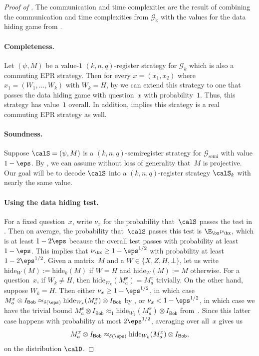 \documentclass[11pt]{article}
\newcommand{\hideq}{H}
\newcommand{\noop}{\bot}
\newcommand{\game}{\mathscr{G}}
\newcommand{\reg}[1]{{\mathsf{#1}}}
\newcommand{\hide}[2]{\mathrm{hide}_{#1}(#2)}
\begin{document}
\newcommand{\phoenicianindahizzous}{\textphnc{h}}

\begin{proof}[Proof of ]
The communication and time complexities are the result of combining
the communication and time complexities from $\game_{\mathrm{k}}$ with the values for the data hiding game from .

\paragraph{Completeness.}
Let $(\psi, M)$ be a value-$1$ $(k,n,q)$-register strategy for $\game_{k}$ which is also a commuting EPR strategy.
Then for every $x = (x_1, x_2)$ where $x_1 = (W_1, \ldots, W_k)$ with $W_k = \hideq$,
by 
we can extend this strategy to one that passes the data hiding game with question~$x$ with probability~$1$.
Thus, this strategy has value~$1$ overall.
In addition,  implies this strategy is a real commuting EPR strategy as well.

\paragraph{Soundness.}
Suppose $\calS = (\psi, M)$ is a $(k, n, q)$-semiregister strategy for $\game_{\mathrm{semi}}$ with value $1-\eps$.
By , we can assume without loss of generality that~$M$ is projective.
Our goal will be to decode $\calS$ into a $(k, n, q)$-register strategy $\calS_{k}$ with nearly the same value.

\paragraph{Using the data hiding test.}
For a fixed question~$x$, write $\nu_x$ for the probability that~$\calS$ passes the test in .
Then on average, the probability that~$\calS$ passes this test is $\E_{\bx} \nu_{\bx}$,
which is at least $1-2\eps$ because the overall test passes with probability at least $1-\eps$.
This implies that $\nu_{\bx} \geq 1-\eps^{1/2}$ with probability at least $1-2\eps^{1/2}$.
Given a matrix~$M$ and a $W \in \{X, Z, \hideq, \noop\}$, let us write $\hide{W}{M}:= \hide{k}{M}$ if $W = \hideq$
and $\hide{W}{M}:=M$ otherwise.
For a question~$x$, if $W_k \neq \hideq$, then $\hide{W_k}{M^x_a} = M^x_a$ trivially.
On the other hand, suppose $W_k = \hideq$.
Then either $\nu_x \geq 1-\eps^{1/2}$,
in which case $M^x_a \otimes I_{\reg{Bob}} \approx_{\delta(\eps)} \hide{W_k}{M^x_a}\otimes I_{\reg{Bob}}$ by ,
or $\nu_x < 1-\eps^{1/2}$,
in which case we have the trivial bound $M^x_a \otimes I_{\reg{Bob}} \approx_{1} \hide{W_k}{M^x_a}\otimes I_{\reg{Bob}}$ from~.
Since this latter case happens with probability at most $2\eps^{1/2}$,
averaging over all~$x$ gives us
\begin{equation}\label{eq:dr-jekyll-mr-hide}
M^x_a \otimes I_{\reg{Bob}} \approx_{\delta(\eps)} \hide{W_k}{M^x_a}\otimes I_{\reg{Bob}},
\end{equation}
on the distribution $\calD$.


\end{proof}
\end{document}
